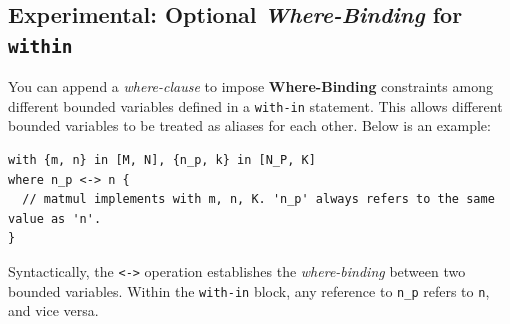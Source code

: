 \subsection*{Experimental: Optional \emph{Where-Binding} for \texttt{within}}

You can append a \emph{where-clause} to impose \textbf{Where-Binding} constraints among different bounded variables defined in a \texttt{with-in} statement. This allows different bounded variables to be treated as aliases for each other. Below is an example:

\begin{lstlisting}[language=croqtile,caption={Experimental: Optional Where-Binding for within}]
with {m, n} in [M, N], {n_p, k} in [N_P, K]
where n_p <-> n {
  // matmul implements with m, n, K. 'n_p' always refers to the same value as 'n'.
}
\end{lstlisting}

Syntactically, the \texttt{\textless{}-\allowbreak{}\textgreater{}} operation establishes the \emph{where-binding} between two bounded variables. Within the \texttt{with-in} block, any reference to \texttt{n\_p} refers to \texttt{n}, and vice versa.
